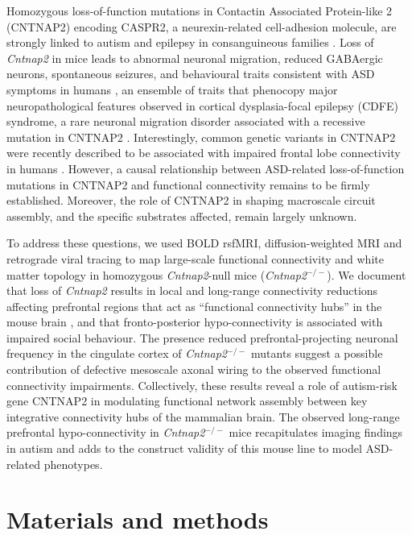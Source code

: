 Homozygous loss-of-function mutations in Contactin Associated Protein-like 2
(CNTNAP2) encoding CASPR2, a neurexin-related cell-adhesion molecule, are
strongly linked to autism and epilepsy in consanguineous families
\parencite{strauss2006, alarcon2008, rodenas-cuadrado2014}. Loss of \textit{Cntnap2} in
mice leads to abnormal neuronal migration, reduced GABAergic neurons,
spontaneous seizures, and behavioural traits consistent with ASD symptoms in
humans \parencite{penagarikano2011}, an ensemble of traits that phenocopy major
neuropathological features observed in cortical dysplasia-focal epilepsy (CDFE)
syndrome, a rare neuronal migration disorder associated with a recessive
mutation in CNTNAP2 \parencite{strauss2006}.  Interestingly, common genetic
variants in CNTNAP2 were recently described to be associated with impaired
frontal lobe connectivity in humans \parencite{scott-vanzeeland2010}.  However,
a causal relationship between ASD-related loss-of-function mutations in CNTNAP2
and functional connectivity remains to be firmly established. Moreover, the role
of CNTNAP2 in shaping macroscale circuit assembly, and the specific substrates
affected, remain largely unknown.

To address these questions, we used BOLD rsfMRI, diffusion-weighted MRI and
retrograde viral tracing to map large-scale functional connectivity and white
matter topology in homozygous \textit{Cntnap2}-null mice (\textit{Cntnap2}$^{-/-}$). We document that
loss of \textit{Cntnap2} results in local and long-range connectivity reductions
affecting prefrontal regions that act as “functional connectivity hubs” in the
mouse brain \parencite{liska2015}, and that fronto-posterior hypo-connectivity
is associated with impaired social behaviour. The presence reduced
prefrontal-projecting neuronal frequency in the cingulate cortex of \textit{Cntnap2}$^{-/-}$
mutants suggest a possible contribution of defective mesoscale axonal wiring to
the observed functional connectivity impairments. Collectively, these results
reveal a role of autism-risk gene CNTNAP2 in modulating functional network
assembly between key integrative connectivity hubs of the mammalian brain. The
observed long-range prefrontal hypo-connectivity in \textit{Cntnap2}$^{-/-}$ mice
recapitulates imaging findings in autism and adds to the construct validity of
this mouse line to model ASD-related phenotypes.

\section{Materials and methods}


